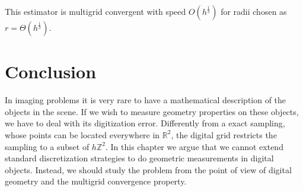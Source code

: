 This estimator is multigrid convergent with speed $O(h^\frac{1}{3})$ for radii chosen as $r=\Theta(h^\frac{1}{3})$.  

\section{Conclusion}

In imaging problems it is very rare to have a mathematical description of the objects in the scene. If we wish to measure geometry properties on these objects, we have to deal with its digitization error. Differently from a exact sampling, whose points can be located everywhere in $\mathbb{R}^2$, the digital grid restricts the sampling to a subset of $h\mathbb{Z}^2$. In this chapter we argue that we cannot extend standard discretization strategies to do geometric measurements in digital objects. Instead, we should study the problem from the point of view of digital geometry and the multigrid convergence property.


